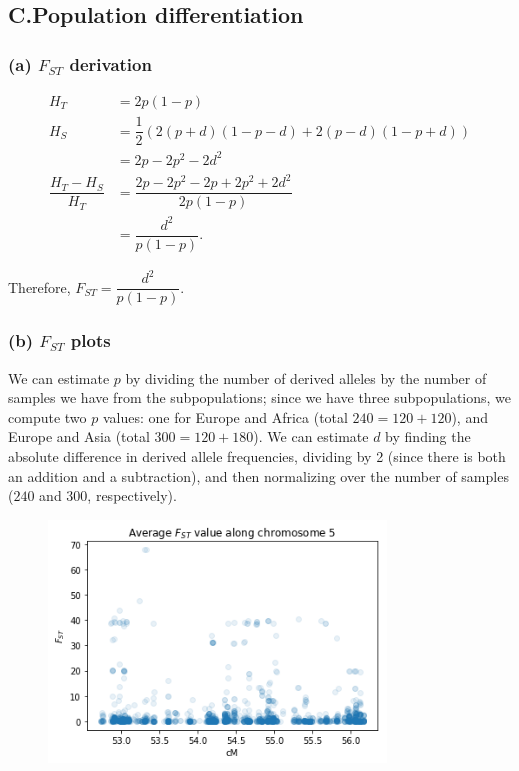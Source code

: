 \documentclass{article}[11pt]
\begin{document}
\subsection*{C.\quad Population differentiation}
\subsubsection*{(a) $F_{ST}$ derivation}

\begin{align}
    H_T & = 2p(1 - p) \\
    H_S & = \dfrac{1}{2}(2(p + d)(1 - p - d) + 2(p - d)(1 - p + d))\\
        & = 2p - 2p^2 - 2d^2 \\
    \dfrac{H_T - H_S}{H_T} & = \dfrac{2p - 2p^2 - 2p + 2p^2 + 2d^2}{2p(1 - p)}\\
        & = \dfrac{d^2}{p(1-p)}.
\end{align}

Therefore, $F_{ST} = \dfrac{d^2}{p(1 - p)}$.

\subsubsection*{(b) $F_{ST}$ plots}
We can estimate $p$ by dividing the number of derived alleles by
the number of samples we have from the subpopulations; since
we have three subpopulations, we compute two $p$ values: one for
Europe and Africa (total $240 = 120 + 120$), and Europe and Asia
(total $300 = 120 + 180$). We can estimate $d$ by finding the
absolute difference in derived allele frequencies, dividing
by 2 (since there is both an addition and a subtraction),
and then normalizing over the number of samples ($240$ and $300$,
respectively).

\begin{figure}[H]
    \includegraphics[width=0.8\textwidth]{problem1/fst.png}
\end{figure}
\end{document}
